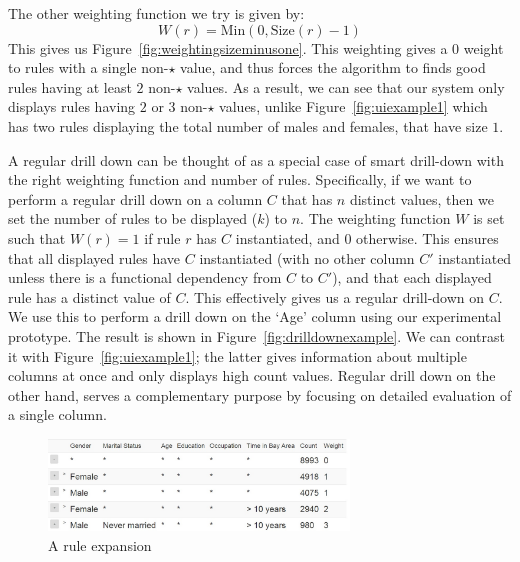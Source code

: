\documentclass[10pt,journal,compsoc]{IEEEtran}
\newcommand{\papertext}[1]{}
\newcommand{\techreporttext}[1]{#1}
\begin{document}
The other weighting function we try is given by:
$$W(r) = \text{Min}(0, \text{Size}(r) - 1)$$
This gives us Figure~\ref{fig:weightingsizeminusone}. This weighting gives a $0$ weight to rules with a single non-$\star$ value, and thus forces the algorithm to finds good rules having at least $2$ non-$\star$ values. As a result, we can see that our system only displays rules having $2$ or $3$ non-$\star$ values, unlike Figure~\ref{fig:uiexample1} which has two rules displaying the total number of males and females, that have size $1$.

A regular drill down can be thought of as a special case of smart drill-down with the right weighting function and number of rules\papertext{ (see technical report for details)}\techreporttext{. Specifically, if we want to perform a regular drill down on a column $C$ that has $n$ distinct values, then we set the number of rules to be displayed ($k$) to $n$. The weighting function $W$ is set such that $W(r) = 1$ if rule $r$ has $C$ instantiated, and $0$ otherwise. This ensures that all displayed rules have $C$ instantiated (with no other column $C'$ instantiated unless there is a functional dependency from $C$ to $C'$), and that each displayed rule has a distinct value of $C$. This effectively gives us a regular drill-down on $C$}. We use this to perform a drill down on the `Age' column using our experimental prototype. The result is shown in Figure~\ref{fig:drilldownexample}. We can contrast it with Figure~\ref{fig:uiexample1}; the latter gives information about multiple columns at once and only displays high count values. Regular drill down on the other hand, serves a complementary purpose by focusing on detailed evaluation of a single column.



\begin{figure}
\centering
\includegraphics[width=80mm,frame]{graphs/screenshots6col/empty_expansion.jpg}
\caption{A rule expansion \label{fig:uiexamplerule}}
\vspace{-10pt}
\end{figure}
\end{document}
